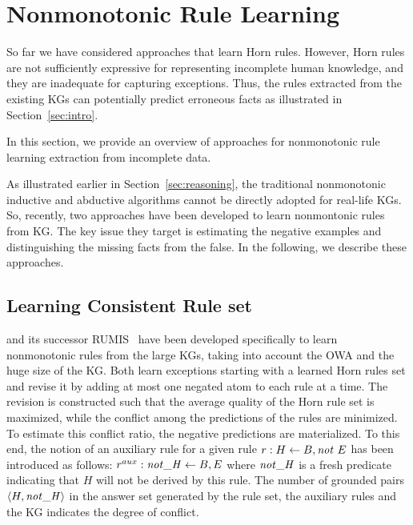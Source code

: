 \section{Nonmonotonic Rule Learning}\label{sec:nmrulelearn}
So far we have considered approaches that learn Horn rules. However,  Horn rules are not sufficiently expressive for representing incomplete human knowledge, and they are inadequate for capturing
exceptions. Thus, the rules extracted from the existing KGs can potentially %
predict erroneous facts as illustrated in Section~\ref{sec:intro}. 

In this section, we provide an overview of approaches for nonmonotonic rule learning extraction from incomplete data. 

As illustrated earlier in Section~\ref{sec:reasoning}, the traditional nonmonotonic inductive and abductive algorithms cannot be directly adopted for real-life KGs. So, recently, two approaches have been developed to learn nonmontonic rules from KG. The key issue they target is estimating the negative examples and distinguishing the missing facts from the false. In the following, we describe these approaches.


\subsection{Learning Consistent Rule set}
\cite{gad2016} and its successor RUMIS~\cite{rumis} have been developed specifically to learn nonmonotonic rules from the large KGs, taking into account the OWA and the huge size of the KG. 
Both %
learn exceptions starting with a learned Horn rules set and revise it by  
adding at most one negated atom to each rule at a time. The revision is constructed such that the average quality of the Horn rule set is maximized, while the conflict among the predictions of the rules are minimized. To estimate this conflict ratio, the negative predictions are materialized. To this end, %
the notion of an auxiliary rule for a given rule $r:H \leftarrow B, \mathit{not}~ E$ has been introduced as follows: %
$r^{aux}:\mathit{not\_H} \leftarrow B, E$ where $\mathit{not\_H}$ is a fresh predicate indicating that $H$ will not be derived by this rule. The number of grounded pairs $\langle H,\mathit{not\_H}\rangle$ in the answer set generated by the rule set, the auxiliary rules and the KG indicates the degree of conflict.

